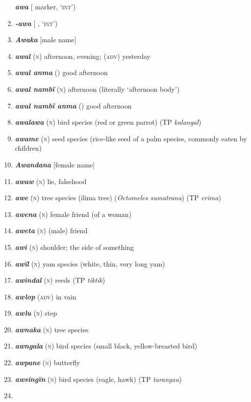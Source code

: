 \begin{enumerate}[noitemsep, label={}, align=left, widest=190, labelsep=1ex,leftmargin=*,itemindent=-10pt]
\textbf{\textit{awa}} [ marker, ‘\textsc{int}’) \item 
\textbf{\textit{-awa}} [ , ‘\textsc{int}’) \item 
\textbf{\textit{Awaka}} [male name] \item 
\textbf{\textit{awal}} (\textsc{n}) afternoon, evening; (\textsc{adv}) yesterday \item 
\textbf{\textit{awal anma}} () good afternoon \item 
\textbf{\textit{awal nambï}} (\textsc{n}) afternoon (literally ‘afternoon body’) \item 
\textbf{\textit{awal nambï anma}} () good afternoon \item 
\textbf{\textit{awalawa}} (\textsc{n}) bird species (red or green parrot) (TP \textit{kalangal}) \item 
\textbf{\textit{awame}} (\textsc{n}) seed species (rice-like seed of a palm species, commonly eaten by children) \item 
\textbf{\textit{Awandana}} [female name] \item 
\textbf{\textit{awaw}} (\textsc{n}) lie, falsehood  \item 
\textbf{\textit{awe}} (\textsc{n}) tree species (ilima tree) (\textit{Octomeles sumatrana}) (TP \textit{erima}) \item 
\textbf{\textit{awena}} (\textsc{n}) female friend (of a woman) \item 
\textbf{\textit{aweta}} (\textsc{n}) (male) friend \item 
\textbf{\textit{awi}} (\textsc{n}) shoulder; the side of something \item 
\textbf{\textit{awïl}} (\textsc{n}) yam species (white, thin, very long yam) \item 
\textbf{\textit{awindal}} (\textsc{n}) reeds (TP \textit{tiktik}) \item 
\textbf{\textit{awlop}} (\textsc{adv}) in vain \item 
\textbf{\textit{awlu}} (\textsc{n}) step \item 
\textbf{\textit{awnaka}} (\textsc{n}) tree species \item 
\textbf{\textit{awngala}} (\textsc{n}) bird species (small black, yellow-breasted bird) \item 
\textbf{\textit{awpane}} (\textsc{n}) butterfly \item 
\textbf{\textit{awsingïn}} (\textsc{n}) bird species (eagle, hawk) (TP \textit{tarangau}) \item 

\end{enumerate}
